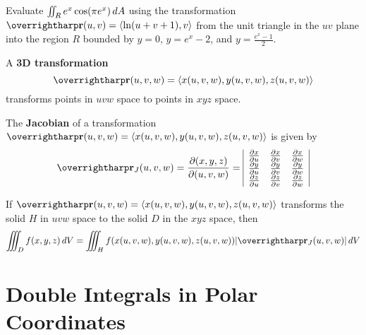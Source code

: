 \documentclass[letterpaper, twoside, 12pt]{book}
\begin{document}
          \begin{problem}
            Evaluate $\iint_R e^x\cos(\pi e^x)\,d{A}$ using the transformation
            $\vect{r}(u,v)=\<\ln (u+v+1),v\>$ from the unit triangle in
            the $uv$ plane into the region $R$ bounded by
            $y=0$, $y=e^x-2$, and $y=\frac{e^x-1}{2}$.
          \end{problem}

          \begin{solution}

          \end{solution}

          \begin{contributors}

          \end{contributors}

\begin{definition}
  A \textbf{3D transformation}
  \[
    \vect{r}(u,v,w)
      =
    \<x(u,v,w),y(u,v,w),z(u,v,w)\>
  \]
  transforms points in $uvw$ space to points in $xyz$ space.
\end{definition}

\begin{definition}
  The \textbf{Jacobian} of a transformation
    $\vect{r}(u,v,w)
      =
    \<x(u,v,w),y(u,v,w),z(u,v,w)\>$
  is given by
    \[
    \vect{r}_J(u,v,w) = \frac{\p (x,y,z)}{\p (u,v,w)} =
    \begin{array}{|c c c|}
    \frac{\p x}{\p u} & \frac{\p x}{\p v} & \frac{\p x}{\p w} \\
    \frac{\p y}{\p u} & \frac{\p y}{\p v} & \frac{\p y}{\p w} \\
    \frac{\p z}{\p u} & \frac{\p z}{\p v} & \frac{\p z}{\p w}
    \end{array}
    \]
\end{definition}

\begin{theorem}
  If $\vect{r}(u,v,w)=\<x(u,v,w),y(u,v,w),z(u,v,w)\>$ transforms the solid
  $H$ in $uvw$ space to the solid $D$ in the $xyz$ space, then
    \[
      \iiint_D f(x,y,z) \dvar{V}
        =
      \iiint_H f(x(u,v,w),y(u,v,w),z(u,v,w)) |\vect{r}_J(u,v,w)|\dvar{V}
    \]
\end{theorem}




\setcounter{section}{3}
\section{Double Integrals in Polar Coordinates} %
\end{document}
